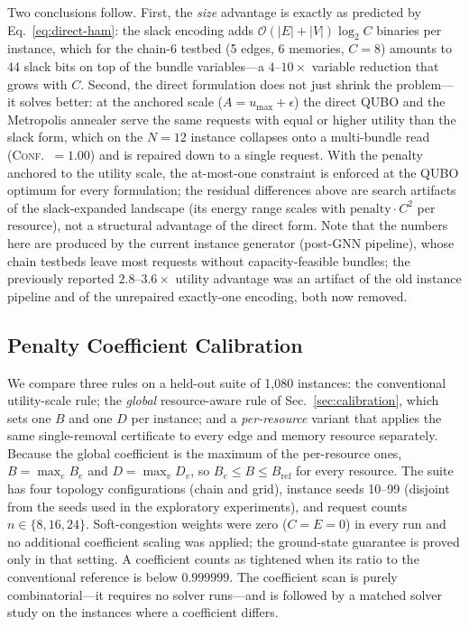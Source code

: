 \documentclass[10pt,a4paper]{article}
\begin{document}
Two conclusions follow.  First, the \emph{size} advantage is exactly
as predicted by Eq.~\eqref{eq:direct-ham}: the slack encoding adds
$\mathcal{O}(|E|+|V|)\log_2 C$ binaries per instance, which for the
chain-$6$ testbed (5 edges, 6 memories, $C{=}8$) amounts to $44$ slack
bits on top of the bundle variables---a $4$--$10\times$ variable
reduction that grows with $C$.  Second, the direct formulation does not
just shrink the problem---it solves better: at the anchored scale
($A{=}u_{\max}{+}\epsilon$) the direct QUBO and the Metropolis
annealer serve the same requests with equal or higher utility than the
slack form, which on the $N{=}12$ instance collapses onto a
multi-bundle read (\textsc{Conf.}~$= 1.00$) and is repaired down to a
single request.  With the penalty anchored to the utility scale, the
at-most-one constraint is enforced at the QUBO optimum for every
formulation; the residual differences above are search artifacts of the
slack-expanded landscape (its energy range scales with
$\mathrm{penalty}\cdot C^2$ per resource), not a structural advantage of
the direct form.  Note that the numbers here are produced by the
current instance generator (post-GNN pipeline), whose chain testbeds
leave most requests without capacity-feasible bundles; the previously
reported $2.8$--$3.6\times$ utility advantage was an artifact of the
old instance pipeline and of the unrepaired exactly-one encoding, both
now removed.

\subsection{Penalty Coefficient Calibration}
\label{sec:results-calibration}

We compare three rules on a held-out suite of 1{,}080 instances: the
conventional utility-scale rule; the \emph{global} resource-aware rule
of Sec.~\ref{sec:calibration}, which sets one $B$ and one $D$ per
instance; and a \emph{per-resource} variant that applies the same
single-removal certificate to every edge and memory resource
separately.  Because the global coefficient is the maximum of the
per-resource ones, $B=\max_e B_e$ and $D=\max_v D_v$, so
$B_e \le B \le B_{\mathrm{ref}}$ for every resource.  The suite has four
topology configurations (chain and grid), instance seeds 10--99
(disjoint from the seeds used in the exploratory experiments), and
request counts $n \in \{8, 16, 24\}$.  Soft-congestion weights were
zero ($C=E=0$) in every run and no additional coefficient scaling was
applied; the ground-state guarantee is proved only in that setting.
A coefficient counts as tightened when its ratio to the conventional
reference is below $0.999999$.  The coefficient scan is purely
combinatorial---it requires no solver runs---and is followed by a
matched solver study on the instances where a coefficient differs.
\end{document}
